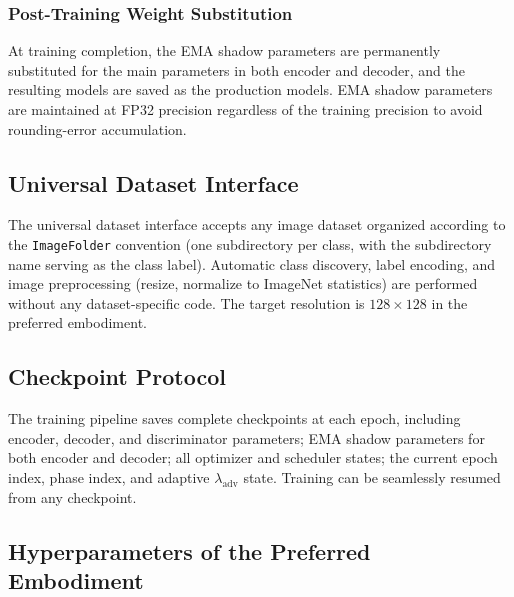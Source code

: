 \documentclass[12pt,letterpaper]{article}
\begin{document}
\subsubsection{Post-Training Weight Substitution}

At training completion, the EMA shadow parameters are permanently substituted
for the main parameters in both encoder and decoder, and the resulting models
are saved as the production models.  EMA shadow parameters are maintained at
FP32 precision regardless of the training precision to avoid rounding-error
accumulation.

\subsection{Universal Dataset Interface}

The universal dataset interface accepts any image dataset organized
according to the \texttt{ImageFolder} convention (one subdirectory per class,
with the subdirectory name serving as the class label).  Automatic class
discovery, label encoding, and image preprocessing (resize, normalize to
ImageNet statistics) are performed without any dataset-specific code.  The
target resolution is $128 \times 128$ in the preferred embodiment.

\subsection{Checkpoint Protocol}

The training pipeline saves complete checkpoints at each epoch, including
encoder, decoder, and discriminator parameters; EMA shadow parameters for
both encoder and decoder; all optimizer and scheduler states; the current
epoch index, phase index, and adaptive $\lambda_{\text{adv}}$ state.
Training can be seamlessly resumed from any checkpoint.


\subsection{Hyperparameters of the Preferred Embodiment}
\end{document}
